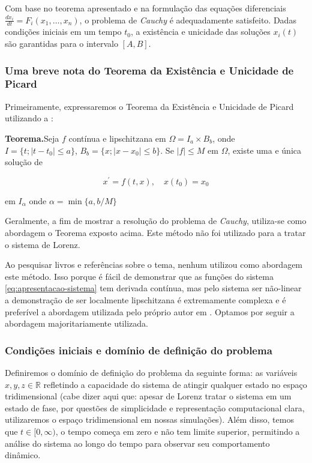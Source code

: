 \documentclass[12pt, a4paper]{article}
\begin{document}
    Com base no teorema apresentado e na formulação das equações diferenciais
    $\frac{dx_i}{dt} = F_i(x_1, \ldots, x_n)$, o problema de \textit{Cauchy} é
    adequadamente satisfeito. Dadas condições iniciais em um tempo $t_0$, a
    existência e unicidade das soluções $x_i(t)$ são garantidas para o intervalo
    $[A, B]$.
    
    \subsubsection{Uma breve nota do Teorema da Existência e Unicidade de
        Picard}
    Primeiramente, expressaremos o Teorema da Existência e Unicidade de Picard
    utilizando a \cite{sotomayor1979}:
    
    \textbf{Teorema.}Seja $f$ contínua e lipschitzana em $\Omega = I_a \times
        B_b$, onde $I = \{t; \left|t - t_0 \right| \leq a\}$, $B_b = \{x; \left|x -
        x_0
        \right| \leq b\}$. Se $|f| \leq M$ em $\Omega$, existe uma e única solução
    de
    
    \begin{equation*}
        x^\prime = f(t, x), \quad x(t_0) = x_0
    \end{equation*}
    
    em $I_\alpha$ onde $\alpha = \min \{a, b/M\}$
    
    Geralmente, a fim de mostrar a resolução do problema de \textit{Cauchy},
    utiliza-se como abordagem o Teorema exposto acima. Este método não foi
    utilizado para a tratar o sistema de Lorenz.
    
    Ao pesquisar livros e referências sobre o tema, nenhum utilizou como
    abordagem este método. Isso porque é fácil de demonstrar que as funções do
    sistema \eqref{eq:apresentacao-sistema} tem derivada contínua, mas pelo sistema
    ser não-linear a demonstração de ser localmente lipschitzana é extremamente
    complexa e é preferível a abordagem utilizada pelo próprio autor em
    \cite{Lorenz1963}. Optamos por seguir a abordagem majoritariamente utilizada.
    
    \subsubsection{Condições iniciais e domínio de definição do problema}
    \label{sec:cond-ini}
    Definiremos o domínio de definição do problema da seguinte forma: as
    variáveis $x,y, z \in \mathbb{R}$ refletindo a capacidade do sistema de atingir
    qualquer estado no espaço tridimensional (cabe dizer aqui que: apesar de Lorenz
    tratar o sistema em um estado de fase, por questões de simplicidade e
    representação computacional clara, utilizaremos o espaço tridimensional em
    nossas simulações). Além disso, temos que $t \in [0, \infty)$, o tempo começa
    em zero e não tem limite superior, permitindo a análise do sistema ao longo do
    tempo para observar seu comportamento dinâmico.
    
\end{document}
